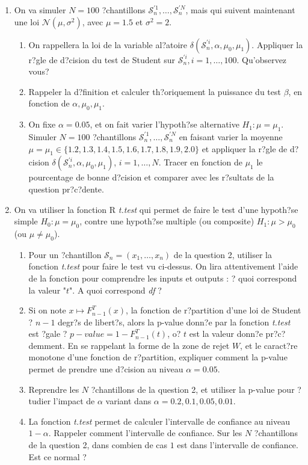 \documentclass{article} %
\begin{document}
\begin{enumerate}
\item On va simuler $N=100$ ?chantillons $\mathcal{S}^{'1}_n, \dots, \mathcal{S}^{'N}_n$, mais qui suivent maintenant une loi  $\mathcal{N}(\mu,\sigma^2)$, avec $\mu = 1.5$ et $\sigma^2 = 2$. 
\begin{enumerate}
\item On rappellera la loi de la variable al?atoire $\delta(\mathcal{S}^{'i}_n,\alpha,\mu_0,\mu_1)$. Appliquer la r?gle de d?cision du test de Student sur $\mathcal{S}_n^{'i}, i=1,\dots,100$. Qu'observez vous?
\item Rappeler la d?finition et calculer th?oriquement la puissance du test $\beta$, en fonction de $\alpha,\mu_0,\mu_1$. 
\item On fixe $\alpha= 0.05$, et on fait varier l'hypoth?se alternative $H_1 : \mu = \mu_1$.  Simuler $N=100$ ?chantillons $\mathcal{S}^{'1}_n, \dots, \mathcal{S}^{'N}_n$ en faisant varier la moyenne $\mu = \mu_1 \in \{1.2, 1.3, 1.4, 1.5, 1.6, 1.7, 1.8, 1.9, 2.0\}$ et  appliquer la r?gle de d?cision $\delta(\mathcal{S}^{'i}_n,\alpha,\mu_0,\mu_1)$, $i=1,\dots,N$. Tracer en fonction de $\mu_1$ le pourcentage de bonne d?cision et comparer avec les r?sultats de la question pr?c?dente. 
\end{enumerate}

\item On va utiliser la fonction R \emph{t.test} qui permet de faire le test d'une hypoth?se simple $H_0 : \mu = \mu_0$, contre une hypoth?se multiple (ou composite) $H_1 : \mu > \mu_0$ (ou $\mu \neq \mu_0$). 

\begin{enumerate}
\item Pour un ?chantillon $\mathcal{S}_n=(x_1,\dots,x_n)$ de la question 2, utiliser la fonction \emph{t.test} pour faire le test vu ci-dessus. On lira attentivement l'aide de la fonction pour comprendre les inputs et outputs : ? quoi correspond la valeur "$t$". A quoi correspond \emph{df} ? 
\item  Si on note $x \mapsto F_{n-1}^T(x)$, la fonction de r?partition d'une loi de Student ? $n-1$ degr?s de libert?s, alors la p-value donn?e par la fonction \emph{t.test} est ?gale ? $p-value=1-F_{n-1}^T(t)$, o? $t$ est la valeur donn?e pr?c?demment. En se rappelant la forme de la zone de rejet $W$, et le caract?re monotone d'une fonction de r?partition, expliquer comment la p-value permet de prendre une d?cision au niveau $\alpha=0.05$. 
\item Reprendre les $N$ ?chantillons de la question 2, et utiliser la p-value pour ?tudier l'impact de $\alpha$ variant dans $\alpha=0.2, 0.1, 0.05, 0.01$.  

\item La fonction \emph{t.test} permet de calculer l'intervalle de confiance au niveau $1-\alpha$. Rappeler comment l'intervalle de confiance. Sur les $N$ ?chantillons de la question 2, dans combien de cas $1$ est dans l'intervalle de confiance. Est ce normal ?
\end{enumerate}

\end{enumerate}
\end{document}
